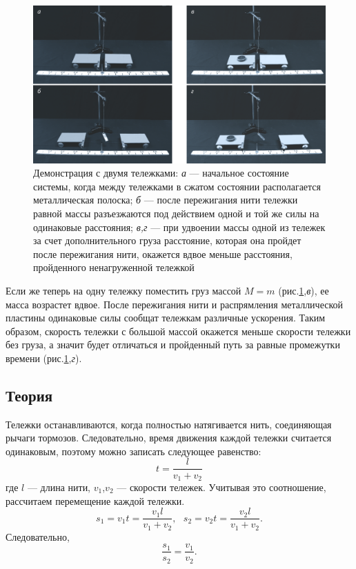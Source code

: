 \documentclass[All.tex]{subfiles}
\begin{document}
\begin{figure}[H]
	\centering
	\includegraphics[width=1\linewidth]{newton-2.png}
	\caption{Демонстрация с двумя тележками: \textit{а} — начальное состояние системы, когда между тележками в сжатом состоянии располагается металлическая полоска; \textit{б} — после пережигания нити тележки равной массы разъезжаются под действием одной и той же силы на одинаковые расстояния; \textit{в,г} — при удвоении массы одной из тележек за счет дополнительного груза расстояние, которая она пройдет после пережигания нити, окажется вдвое меньше расстояния, пройденного ненагруженной тележкой}
	\label{newton-2}
\end{figure}

Если же теперь на одну тележку поместить груз массой  $ M = m $ (рис.\ref{newton-2},\textit{в}), ее масса возрастет вдвое.
После пережигания нити и распрямления металлической пластины одинаковые силы сообщат тележкам различные ускорения.
Таким образом, скорость тележки с большой массой окажется меньше скорости тележки без груза, а значит будет отличаться и пройденный путь за равные промежутки времени (рис.\ref{newton-2},\textit{г}).

\subsection*{\textcolor{PineGreen}{Теория}}

Тележки останавливаются, когда полностью натягивается нить, соединяющая рычаги тормозов. 
Следовательно, время движения каждой тележки считается одинаковым, поэтому можно записать следующее равенство:
\begin{equation}\label{newton-eq1}
 t = \frac{l}{v_{1} + v_{2}}
\end{equation}
где $ l $ — длина нити, $ v_{1} $,$ v_{2} $ — скорости тележек. 
Учитывая это соотношение, рассчитаем перемещение каждой тележки.
 \begin{equation}\label{newton-eq2}
 s_{1} = v_{1}t = \frac{v_{1}l}{v_{1} + v_{2}}, \text{   }
  s_{2} = v_{2}t = \frac{v_{2}l}{v_{1} + v_{2}}.
 \end{equation}
 Следовательно,
  \begin{equation}\label{newton-eq3}
 \frac{s_{1}}{s_{2}} = \frac{v_{1}}{v_{2}}.
 \end{equation}
 
\end{document}
